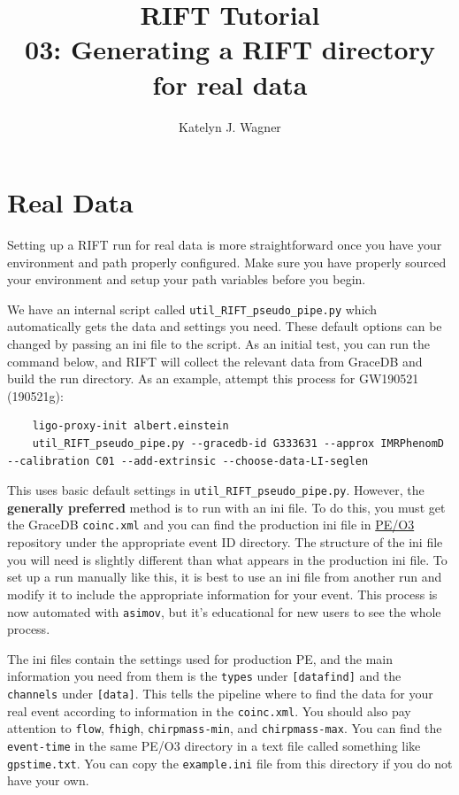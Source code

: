 \documentclass{article}
\title{RIFT Tutorial \\
\large 03: Generating a RIFT directory for real data}
\author{Katelyn J. Wagner}
\date{}
\begin{document}
\maketitle

\section*{Real Data}

Setting up a RIFT run for real data is more straightforward once you have your environment and path properly configured. Make sure you have properly sourced your environment and setup your path variables before you begin.

We have an internal script called \texttt{util\_RIFT\_pseudo\_pipe.py} which automatically gets the data and settings you need. These default options can be changed by passing an ini file to the script. As an initial test, you can run the command below, and RIFT will collect the relevant data from GraceDB and build the run directory. As an example, attempt this process for GW190521 (190521g):

\begin{verbatim}
    ligo-proxy-init albert.einstein
    util_RIFT_pseudo_pipe.py --gracedb-id G333631 --approx IMRPhenomD --calibration C01 --add-extrinsic --choose-data-LI-seglen
\end{verbatim}

This uses basic default settings in \texttt{util\_RIFT\_pseudo\_pipe.py}. However, the \textbf{generally preferred} method is to run with an ini file. To do this, you must get the GraceDB \texttt{coinc.xml} and you can find the production ini file in \href{https://git.ligo.org/pe/O3}{PE/O3} repository under the appropriate event ID directory. The structure of the ini file you will need is slightly different than what appears in the production ini file. To set up a run manually like this, it is best to use an ini file from another run and modify it to include the appropriate information for your event. This process is now automated with \texttt{asimov}, but it's educational for new users to see the whole process.

The ini files contain the settings used for production PE, and the main information you need from them is the \texttt{types} under \texttt{[datafind]} and the \texttt{channels} under \texttt{[data]}. This tells the pipeline where to find the data for your real event according to information in the \texttt{coinc.xml}. You should also pay attention to \texttt{flow}, \texttt{fhigh}, \texttt{chirpmass-min}, and \texttt{chirpmass-max}. You can find the \texttt{event-time} in the same PE/O3 directory in a text file called something like \texttt{gpstime.txt}. You can copy the \texttt{example.ini} file from this directory if you do not have your own.
\end{document}
